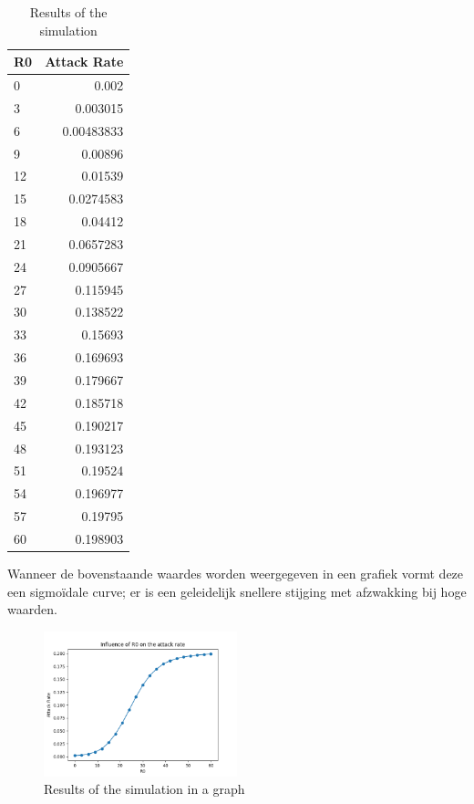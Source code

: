 \documentclass{article}
\begin{document}
\begin{table}[h]
	\centering
	\begin{tabular}{ | l | r | }
		\hline			
		\textbf{R0} & \textbf{Attack Rate}  \\ \hline
0 & 0.002 \\
3 & 0.003015 \\
6 & 0.00483833 \\
9 & 0.00896 \\
12 & 0.01539 \\
15 & 0.0274583 \\
18 & 0.04412 \\
21 & 0.0657283 \\
24 & 0.0905667 \\
27 & 0.115945 \\
30 & 0.138522 \\
33 & 0.15693 \\
36 & 0.169693 \\
39 & 0.179667 \\
42 & 0.185718 \\
45 & 0.190217 \\
48 & 0.193123 \\
51 & 0.19524 \\
54 & 0.196977 \\
57 & 0.19795 \\
60 & 0.198903 \\
		\hline  
	\end{tabular}
	\caption{Results of the simulation}
\end{table}

\newpage
 
Wanneer de bovenstaande waardes worden weergegeven in een grafiek vormt deze een sigmo\"{i}dale curve; er is een geleidelijk snellere stijging met afzwakking bij hoge waarden.

\begin{figure}[h]
	\centering
	\includegraphics[width=0.5\textwidth]{r0_2}
	\caption{Results of the simulation in a graph}
\end{figure}
\end{document}
